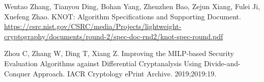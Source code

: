 \begin{thebibliography}{8}
Wentao Zhang, Tianyou Ding, Bohan Yang, Zhenzhen Bao, Zejun Xiang, Fulei Ji, Xuefeng Zhao. KNOT: Algorithm Specifications and Supporting Document. \url{https://csrc.nist.gov/CSRC/media/Projects/lightweight-cryptography/documents/round-2/spec-doc-rnd2/knot-spec-round.pdf}

Zhou C, Zhang W, Ding T, Xiang Z. Improving the MILP-based Security Evaluation Algorithms against Differential Cryptanalysis Using Divide-and-Conquer Approach. IACR Cryptology ePrint Archive. 2019;2019:19.





\end{thebibliography}